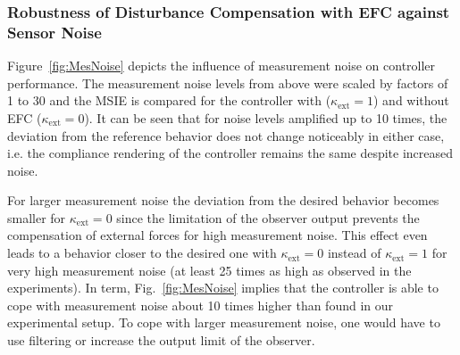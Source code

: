 \subsubsection{Robustness of Disturbance Compensation with EFC against Sensor Noise}

Figure~\ref{fig:MesNoise} depicts the influence of measurement noise on controller performance.
The measurement noise levels from above were scaled by factors of 1 to 30 and the MSIE is compared for the controller with ($\kappa_\mathrm{ext}=1$) and without EFC ($\kappa_\mathrm{ext}=0$).
It can be seen that for noise levels amplified up to 10 times, the deviation from the reference behavior does not change noticeably in either case, i.e. the compliance rendering of the controller remains the same despite increased noise.

For larger measurement noise the deviation from the desired behavior becomes smaller for $\kappa_\mathrm{ext}=0$ since the limitation of the observer output prevents the compensation of external forces for high measurement noise.
This effect even leads to a behavior closer to the desired one with \mbox{$\kappa_\mathrm{ext}=0$} instead of \mbox{$\kappa_\mathrm{ext}=1$} for very high measurement noise (at least 25 times as high as observed in the experiments).
In term, Fig.~\ref{fig:MesNoise} implies that the controller is able to cope with measurement noise about 10 times higher than found in our experimental setup.
To cope with larger measurement noise, one would have to use filtering or increase the output limit of the observer.
